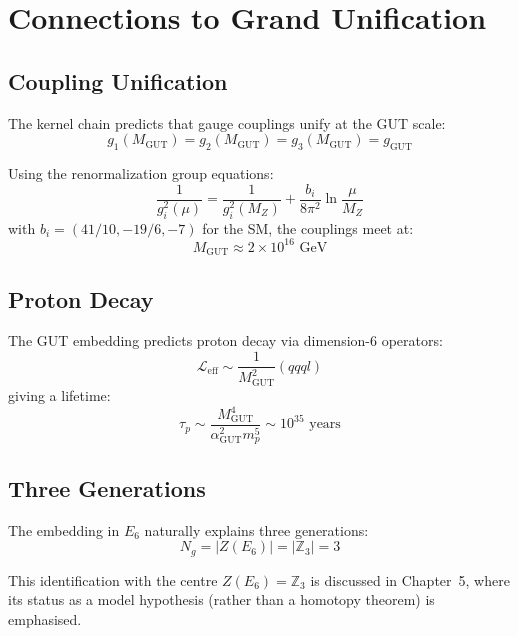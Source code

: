 \documentclass[11pt,a4paper,openright]{book}
\theoremstyle{plain}
\theoremstyle{definition}
\newcommand{\GUT}{\mathrm{GUT}}
\newcommand{\Z}{\mathbb{Z}}
\newcommand{\MGUT}{M_{\mathrm{GUT}}}
\begin{document}
\section{Connections to Grand Unification}

\subsection{Coupling Unification}

The kernel chain predicts that gauge couplings unify at the GUT scale:
\begin{equation}
g_1(\MGUT) = g_2(\MGUT) = g_3(\MGUT) = g_{\GUT}
\end{equation}

Using the renormalization group equations:
\begin{equation}
\frac{1}{g_i^2(\mu)} = \frac{1}{g_i^2(M_Z)} + \frac{b_i}{8\pi^2} \ln\frac{\mu}{M_Z}
\end{equation}
with $b_i = (41/10, -19/6, -7)$ for the SM, the couplings meet at:
\begin{equation}
\MGUT \approx 2 \times 10^{16} \text{ GeV}
\end{equation}

\subsection{Proton Decay}

The GUT embedding predicts proton decay via dimension-6 operators:
\begin{equation}
\mathcal{L}_{\mathrm{eff}} \sim \frac{1}{\MGUT^2} (qqql)
\end{equation}
giving a lifetime:
\begin{equation}
\tau_p \sim \frac{\MGUT^4}{\alpha_{\GUT}^2 m_p^5} \sim 10^{35} \text{ years}
\end{equation}

\subsection{Three Generations}

The embedding in $E_6$ naturally explains three generations:
\begin{equation}
N_g = |Z(E_6)| = |\Z_3| = 3
\end{equation}

This identification with the centre $Z(E_6) = \Z_3$ is discussed in Chapter~5, where its status as a model hypothesis (rather than a homotopy theorem) is emphasised.
\end{document}

